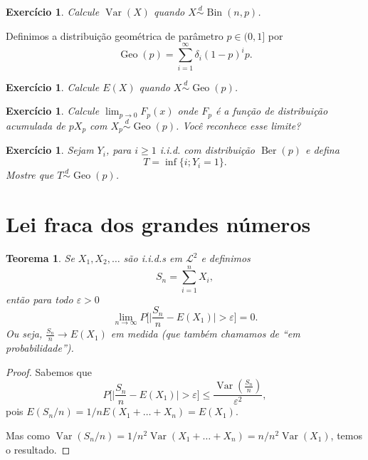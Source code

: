 \documentclass[reqno]{article}
\newcommand*\1{\mathds{1}}
\newtheorem{theorem}{Teorema}[section]
\DeclareMathOperator{\Var}{Var}
\DeclareMathOperator{\Ber}{Ber}
\DeclareMathOperator{\Geo}{Geo}
\DeclareMathOperator{\Bin}{Bin}
\newtheorem{exercise}[example]{Exercício}
\begin{document}
\begin{exercise}
  Calcule $\Var(X)$ quando $X \overset{d}\sim \Bin(n, p)$.
\end{exercise}


Definimos a distribuição geométrica de parâmetro $p \in (0,1]$ por
\begin{equation}
  \Geo(p) = \sum_{i = 1}^\infty \delta_i (1-p)^i p.
\end{equation}

\begin{exercise}
  Calcule $E(X)$ quando $X \overset{d}\sim \Geo(p)$.
\end{exercise}

\begin{exercise}
  Calcule $\lim_{p \to 0} F_p(x)$ onde $F_p$ é a função de distribuição acumulada de $p X_p$ com $X_p \overset{d}\sim \Geo(p)$.
  Você reconhece esse limite?
\end{exercise}

\begin{exercise}
  \label{x:geo_time}
  Sejam $Y_i$, para $i \geq 1$ i.i.d. com distribuição $\Ber(p)$ e defina
  \begin{equation}
    T = \inf\{i; Y_i = 1\}.
  \end{equation}
  Mostre que $T \overset{d}\sim \Geo(p)$.
\end{exercise}

\section{Lei fraca dos grandes números}

\begin{theorem}
  \label{t:lei_fraca}
  Se $X_1, X_2, \dots$ são i.i.d.s em $\mathcal{L}^2$ e definimos
  \begin{equation}
    S_n = \sum_{i=1}^n X_i,
  \end{equation}
  então para todo $\varepsilon > 0$
  \begin{equation}
    \lim_{n \to \infty} P \Big[\Big| \frac{S_n}{n} - E(X_1)\Big| > \varepsilon \Big] = 0.
  \end{equation}
  Ou seja, $\tfrac{S_n}{n} \to E(X_1)$ em medida (que também chamamos de ``em probabilidade'').
\end{theorem}

\begin{proof}
  Sabemos que
  \begin{equation}
    P \Big[\Big| \frac{S_n}{n} - E(X_1)\Big| > \varepsilon \Big] \leq \frac{\Var(\tfrac{S_n}{n})}{\varepsilon^2},
  \end{equation}
  pois $E(S_n/n) = 1/n E(X_1 + \dots + X_n) = E(X_1)$.

  Mas como $\Var(S_n/n) = 1/n^2 \Var (X_1 + \dots + X_n) = n/n^2 \Var(X_1)$, temos o resultado.
\end{proof}
\end{document}
